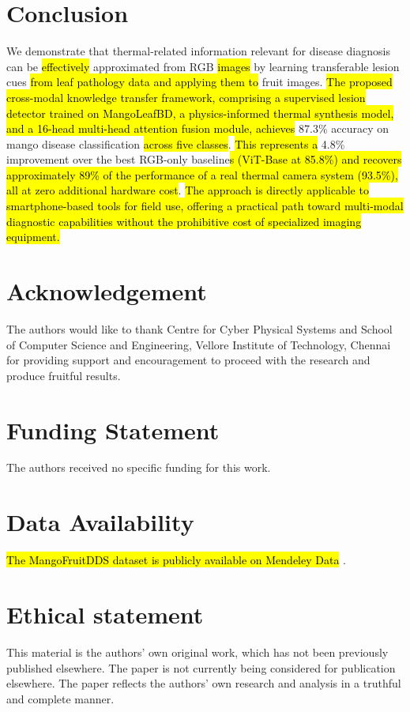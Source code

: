 \documentclass[utf8]{FrontiersinHarvard}
\begin{document}
\section{Conclusion}
We demonstrate that thermal-related information relevant for disease diagnosis can be \hl{effectively} approximated from RGB \hl{images} by learning transferable lesion cues \hl{from leaf pathology data and applying them to} fruit images. \hl{The proposed cross-modal knowledge transfer framework, comprising a supervised lesion detector trained on MangoLeafBD, a physics-informed thermal synthesis model, and a 16-head multi-head attention fusion module, achieves} 87.3\% accuracy on mango disease classification \hl{across five classes}. \hl{This represents a} 4.8\% improvement over the best RGB-only baseline\hl{s (ViT-Base at 85.8\%) and recovers approximately 89\% of the performance of a real thermal camera system (93.5\%), all at zero additional hardware cost}. \hl{The approach is directly applicable to smartphone-based tools for field use, offering a practical path toward multi-modal diagnostic capabilities without the prohibitive cost of specialized imaging equipment.}


\section*{Acknowledgement}
The authors would like to thank Centre for Cyber Physical Systems and School of Computer Science and Engineering, Vellore Institute of Technology, Chennai for providing support and encouragement to proceed with the research and produce fruitful results.

\section*{Funding Statement}
The authors received no specific funding for this work.

\section*{Data Availability}
\hl{The MangoFruitDDS dataset is publicly available on Mendeley Data} \cite{MendeleyDataset}.

\section*{Ethical statement}
This material is the authors' own original work, which has not been previously published elsewhere. The paper is not currently being considered for publication elsewhere. The paper reflects the authors' own research and analysis in a truthful and complete manner.
\end{document}
